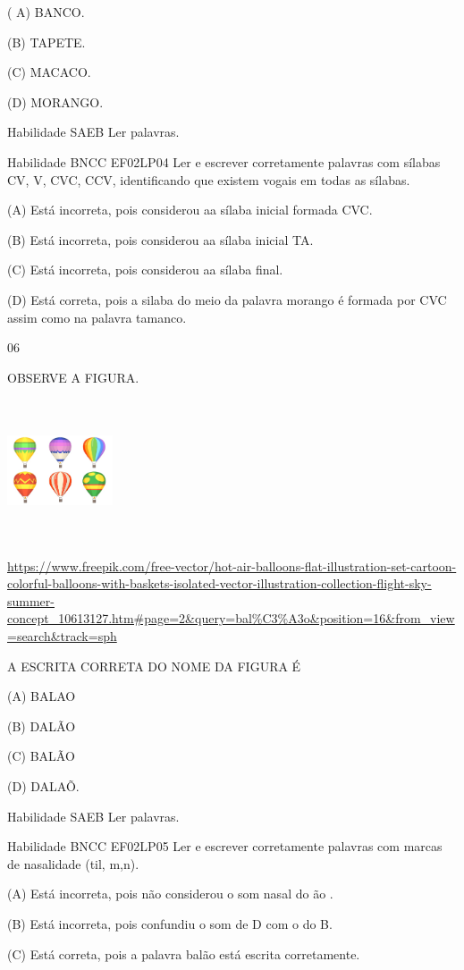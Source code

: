 {{{{{{( A) BANCO.

(B) TAPETE.

(C) MACACO.

(D) MORANGO.

Habilidade SAEB Ler palavras.

Habilidade BNCC EF02LP04 Ler e escrever corretamente palavras com
sílabas CV, V, CVC, CCV, identificando que existem vogais em todas as
sílabas.

(A) Está incorreta, pois considerou aa sílaba inicial formada CVC.

(B) Está incorreta, pois considerou aa sílaba inicial TA.

(C) Está incorreta, pois considerou aa sílaba final.

(D) Está correta, pois a silaba do meio da palavra morango é formada por
CVC assim como na palavra tamanco.

\num{06}

OBSERVE A FIGURA.

\includegraphics[width=1.22569in,height=1.65417in]{media/image167.jpeg}

\url{https://www.freepik.com/free-vector/hot-air-balloons-flat-illustration-set-cartoon-colorful-balloons-with-baskets-isolated-vector-illustration-collection-flight-sky-summer-concept_10613127.htm\#page=2\&query=bal\%C3\%A3o\&position=16\&from_view=search\&track=sph}

A ESCRITA CORRETA DO NOME DA FIGURA É

(A) BALAO

(B) DALÃO

(C) BALÃO

(D) DALAÕ.

Habilidade SAEB Ler palavras.

Habilidade BNCC EF02LP05 Ler e escrever corretamente palavras com marcas
de nasalidade (til, m,n).

(A) Está incorreta, pois não considerou o som nasal do ão .

(B) Está incorreta, pois confundiu o som de D com o do B.

(C) Está correta, pois a palavra balão está escrita corretamente.

}}}}}}
